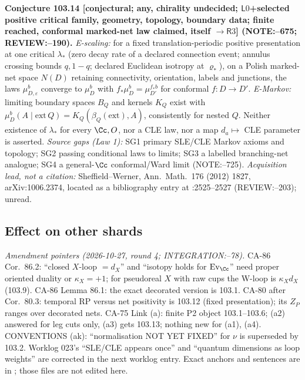 \textbf{Conjecture 103.14 [conjectural; any, chirality undecided; \(\mathsf L0\)+selected positive critical family, geometry, topology,
boundary data; finite reached, conformal marked-net law claimed, itself \(\to\mathsf R3\)] (NOTE:--675; REVIEW:--190).}
\emph{E-scaling:} for a fixed translation-periodic positive presentation at one critical \(\lambda_*\) (zero decay rate of a declared
connection event; annulus crossing bounds \(q,1-q\); declared Euclidean isotropy at \(\varrho_*\)), on a Polish marked-net space \(N(D)\)
retaining connectivity, orientation, labels and junctions, the laws \(\mu^b_{D,\varepsilon}\) converge to \(\mu^b_D\) with
\(f_*\mu^b_D=\mu^{f_*b}_{D'}\) for conformal \(f:D\to D'\). \emph{E-Markov:} limiting boundary spaces \(B_Q\) and kernels \(K_Q\) exist with
\(\mu^b_D(A\mid\text{ext}\,Q)=K_Q(\beta_Q(\text{ext}),A)\), consistently for nested \(Q\). Neither existence of \(\lambda_*\) for every \(\Cc,O\),
nor a CLE law, nor a map \(d_a\mapsto\) CLE parameter is asserted.
\emph{Source gaps (Law 1):} SG1 primary SLE/CLE Markov axioms and topology; SG2 passing conditional laws to limits; SG3 a labelled
branching-net analogue; SG4 a general-\(\Cc\) conformal/Ward limit (NOTE:--725). \emph{Acquisition lead, not a citation:}
Sheffield--Werner, Ann.~Math.~176 (2012) 1827, arXiv:1006.2374, located as a bibliography entry at
:2525--2527 (REVIEW:--203); unread.

\subsection{Effect on other shards}

\emph{Amendment pointers (2026-10-27, round 4; INTEGRATION:--78).} CA-86 Cor.~86.2: ``closed \(X\)-loop \(=d_X\)'' and
``isotopy holds for \(\operatorname{Ev}_\Cc\)'' need proper oriented duality or \(\kappa_X=+1\); for pseudoreal \(X\) with raw cups the
W-loop is \(\kappa_Xd_X\) (103.9). CA-86 Lemma 86.1: the exact decorated version is 103.1. CA-80 after Cor.~80.3: temporal RP
versus net positivity is 103.12 (fixed presentation); its \(Z_P\) ranges over decorated nets. CA-75 Link (a): finite P2 object
103.1--103.6; (a2) answered for leg cuts only, (a3) gets 103.13; nothing new for (a1), (a4). CONVENTIONS (ak): ``normalisation NOT YET
FIXED'' for \(\nu\) is superseded by 103.2. Worklog 023's ``SLE/CLE appears once'' and ``quantum dimensions as loop weights'' are corrected
in the next worklog entry. Exact anchors and sentences are in ; those files are not edited here.

